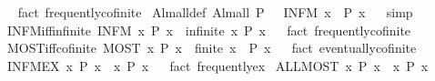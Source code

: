 \begin{isabellebody}
\isadelimproof
\ %
\endisadelimproof
%
\isatagproof
{}\isamarkupfalse%
\ {\isacharparenleft}fact\ frequently{\isacharunderscore}cofinite{\isacharparenright}%
\endisatagproof
{\isafoldproof}%
%
\isadelimproof
%
\endisadelimproof
\isanewline
{}\isamarkupfalse%
\ Alm{\isacharunderscore}all{\isacharunderscore}def{\isacharcolon}\ {\isachardoublequoteopen}Alm{\isacharunderscore}all\ P\ {\isasymlongleftrightarrow}\ {\isasymnot}\ {\isacharparenleft}INFM\ x{\isachardot}\ {\isasymnot}\ P\ x{\isacharparenright}{\isachardoublequoteclose}%
\isadelimproof
\ %
\endisadelimproof
%
\isatagproof
{}\isamarkupfalse%
\ simp%
\endisatagproof
{\isafoldproof}%
%
\isadelimproof
%
\endisadelimproof
\isanewline
{}\isamarkupfalse%
\ INFM{\isacharunderscore}iff{\isacharunderscore}infinite{\isacharcolon}\ {\isachardoublequoteopen}{\isacharparenleft}INFM\ x{\isachardot}\ P\ x{\isacharparenright}\ {\isasymlongleftrightarrow}\ infinite\ {\isacharbraceleft}x{\isachardot}\ P\ x{\isacharbraceright}{\isachardoublequoteclose}%
\isadelimproof
\ %
\endisadelimproof
%
\isatagproof
{}\isamarkupfalse%
\ {\isacharparenleft}fact\ frequently{\isacharunderscore}cofinite{\isacharparenright}%
\endisatagproof
{\isafoldproof}%
%
\isadelimproof
%
\endisadelimproof
\isanewline
{}\isamarkupfalse%
\ MOST{\isacharunderscore}iff{\isacharunderscore}cofinite{\isacharcolon}\ {\isachardoublequoteopen}{\isacharparenleft}MOST\ x{\isachardot}\ P\ x{\isacharparenright}\ {\isasymlongleftrightarrow}\ finite\ {\isacharbraceleft}x{\isachardot}\ {\isasymnot}\ P\ x{\isacharbraceright}{\isachardoublequoteclose}%
\isadelimproof
\ %
\endisadelimproof
%
\isatagproof
{}\isamarkupfalse%
\ {\isacharparenleft}fact\ eventually{\isacharunderscore}cofinite{\isacharparenright}%
\endisatagproof
{\isafoldproof}%
%
\isadelimproof
%
\endisadelimproof
\isanewline
{}\isamarkupfalse%
\ INFM{\isacharunderscore}EX{\isacharcolon}\ {\isachardoublequoteopen}{\isacharparenleft}{\isasymexists}\isactrlsub {\isasyminfinity}x{\isachardot}\ P\ x{\isacharparenright}\ {\isasymLongrightarrow}\ {\isacharparenleft}{\isasymexists}x{\isachardot}\ P\ x{\isacharparenright}{\isachardoublequoteclose}%
\isadelimproof
\ %
\endisadelimproof
%
\isatagproof
{}\isamarkupfalse%
\ {\isacharparenleft}fact\ frequently{\isacharunderscore}ex{\isacharparenright}%
\endisatagproof
{\isafoldproof}%
%
\isadelimproof
%
\endisadelimproof
\isanewline
{}\isamarkupfalse%
\ ALL{\isacharunderscore}MOST{\isacharcolon}\ {\isachardoublequoteopen}{\isasymforall}x{\isachardot}\ P\ x\ {\isasymLongrightarrow}\ {\isasymforall}\isactrlsub {\isasyminfinity}x{\isachardot}\ P\ x{\isachardoublequoteclose}%

\end{isabellebody}
